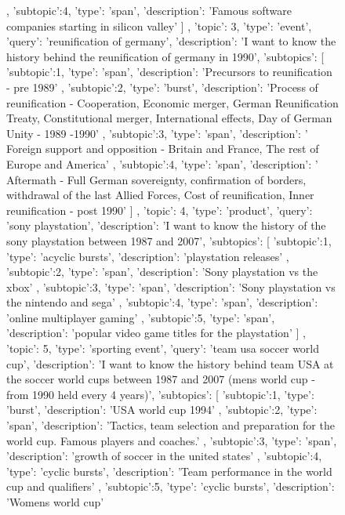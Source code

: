 \begin{figure}[ht]
{\begin{minipage}{\textwidth}
{{			},
			{
				'subtopic':4,
				'type': 'span',
				'description': 'Famous software companies starting in silicon valley'
			}
		]
	},
	{	
		'topic': 3,
		'type': 'event',
		'query': 'reunification of germany',
		'description': 'I want to know the history behind the reunification of germany in 1990',
		'subtopics': [
			{
				'subtopic':1,
				'type': 'span',
				'description': 'Precursors to reunification - pre 1989'
			},
			{
				'subtopic':2,
				'type': 'burst',
				'description': 'Process of reunification - Cooperation, Economic merger, German Reunification Treaty, Constitutional merger, International effects, Day of German Unity - 1989 -1990'
			},
			{
				'subtopic':3,
				'type': 'span',
				'description': ' Foreign support and opposition - Britain and France, The rest of Europe and America'
			},
			{
				'subtopic':4,
				'type': 'span',
				'description': ' Aftermath - Full German sovereignty, confirmation of borders, withdrawal of the last Allied Forces, Cost of reunification, Inner reunification - post 1990'
			}
		]
	},
	{	
		'topic': 4,
		'type': 'product',
		'query': 'sony playstation',
		'description': 'I want to know the history of the sony playstation between 1987 and 2007',
		'subtopics': [
			{
				'subtopic':1,
				'type': 'acyclic bursts',
				'description': 'playstation releases'
			},
			{
				'subtopic':2,
				'type': 'span',
				'description': 'Sony playstation vs the xbox'
			},
			{
				'subtopic':3,
				'type': 'span',
				'description': 'Sony playstation vs the nintendo and sega'
			},
			{
				'subtopic':4,
				'type': 'span',
				'description': 'online multiplayer gaming'
			},
			{
				'subtopic':5,
				'type': 'span',
				'description': 'popular video game titles for the playstation'
			}
		]
	},
	{	
		'topic': 5,
		'type': 'sporting event',
		'query': 'team usa soccer world cup',
		'description': 'I want to know the history behind team USA at the soccer world cups between 1987 and 2007 (mens world cup - from 1990 held every 4 years)',
		'subtopics': [
			{
				'subtopic':1,
				'type': 'burst',
				'description': 'USA world cup 1994'
			},
			{
				'subtopic':2,
				'type': 'span',
				'description': 'Tactics, team selection and preparation for the world cup. Famous players and coaches.'
			},
			{
				'subtopic':3,
				'type': 'span',
				'description': 'growth of soccer in the united states'
			},
			{
				'subtopic':4,
				'type': 'cyclic bursts',
				'description': 'Team performance in the world cup and qualifiers'
			},
			{
				'subtopic':5,
				'type': 'cyclic bursts',
				'description': 'Womens world cup'
			}	
}
\end{minipage}}
\end{figure}
